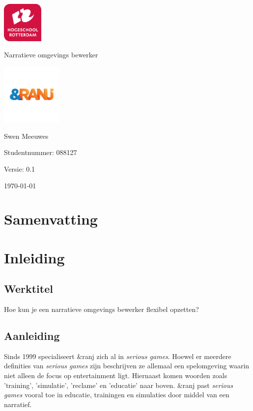 \documentclass{report}
\newcommand{\versionnumber}{0.1}
\newcommand{\name}{Swen Meeuwes}
\newcommand{\studentnumber}{088127}
\newcommand{\organisation}{\&ranj }
\renewcommand{\title}{Narratieve omgevings bewerker}
\newcommand{\subtitle}{Sub title}
\begin{document}
\begin{titlepage}
        \centering
        \includegraphics[width=2cm]{Images/University}\par
        \vspace{4\baselineskip}
        {\Huge\title\par}
        \par
        \includegraphics[width=3cm]{Images/Organisation}
        \vspace{4\baselineskip}
        \par
        {\Large\name\par}
        {Studentnummer: \studentnumber\par}
        \vfill
        {\hfill Versie: \versionnumber\par}
        {\hfill \today}
\end{titlepage}

\chapter*{Samenvatting}

\newpage

\tableofcontents

\newpage

\chapter{Inleiding}
\section{Werktitel}
Hoe kun je een narratieve omgevings bewerker flexibel opzetten? %

\section{Aanleiding}
Sinds 1999 specialiseert \organisation zich al in \emph{serious games}. Hoewel er meerdere definities van \emph{serious games} zijn beschrijven ze allemaal een spelomgeving waarin niet alleen de focus op entertainment ligt\cite{Tarja2007}. Hiernaast komen woorden zoals 'training', 'simulatie', 'reclame' en 'educatie' naar boven\cite{Tarja2007}.
\organisation past \emph{serious games} vooral toe in educatie, trainingen en simulaties\cite{websiteranj} door middel van een narratief.
\end{document}
